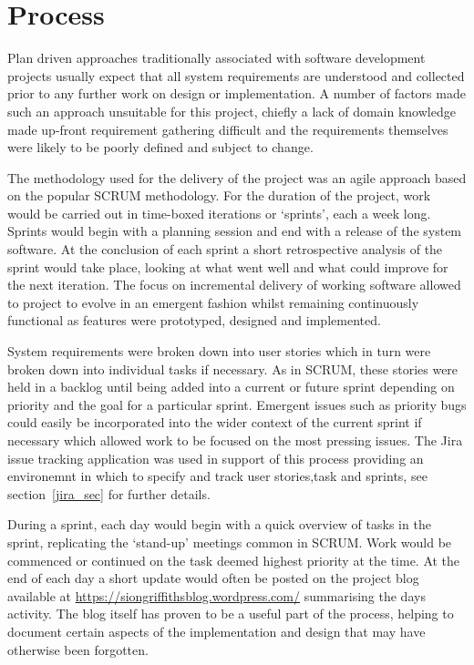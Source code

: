 \section{Process}

Plan driven approaches traditionally associated with software development projects usually expect that all system requirements are understood and collected prior to any further work on design or implementation. A number of factors made such an approach unsuitable for this project, chiefly a lack of domain knowledge made up-front requirement gathering difficult and the requirements themselves were likely to be poorly defined and subject to change. 

The methodology used for the delivery of the project was an agile approach based on the popular SCRUM methodology. For the duration of the project, work would be carried out in time-boxed iterations or `sprints', each a week long. Sprints would begin with a planning session and end with a release of the system software. At the conclusion of each sprint a short retrospective analysis of the sprint would take place, looking at what went well and what could improve for the next iteration. The focus on incremental delivery of working software allowed to project to evolve in an emergent fashion whilst remaining continuously functional as features were prototyped, designed and implemented.  

System requirements were broken down into user stories which in turn were broken down into individual tasks if necessary. As in SCRUM, these stories were held in a backlog until being added into a current or future sprint depending on priority and the goal for a particular sprint. Emergent issues such as priority bugs could easily be incorporated into the wider context of the current sprint if necessary which allowed work to be focused on the most pressing issues. The Jira \cite{jira} issue tracking application was used in support of this process providing an environemnt in which to specify and track user stories,task and sprints, see section~\ref{jira_sec} for further details. 

During a sprint, each day would begin with a quick overview of tasks in the sprint, replicating the `stand-up' meetings common in SCRUM. Work would be commenced or continued on the task deemed highest priority at the time. At the end of each day a short update would often be posted on the project blog available at \url{https://siongriffithsblog.wordpress.com/} summarising the days activity. The blog itself has proven to be a useful part of the process, helping to document certain aspects of the implementation and design that may have otherwise been forgotten.


